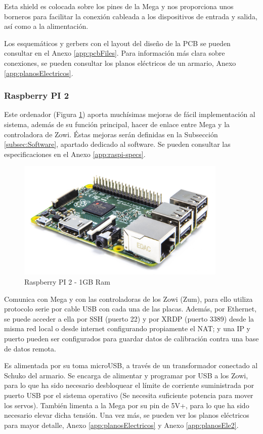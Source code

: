 Esta shield es colocada sobre los pines de la Mega y nos proporciona unos borneros para facilitar la conexión cableada a los dispositivos de entrada y salida, así como a la alimentación.

Los esquemáticos y gerbers con el layout del diseño de la PCB se pueden consultar en el Anexo \ref{app:pcbFiles}. Para información más clara sobre conexiones, se pueden consultar los planos eléctricos de un armario, Anexo \ref{app:planosElectricos}.

\subsubsection{Raspberry PI 2}

Este ordenador (Figura \ref{fig:raspi}) aporta muchísimas mejoras de fácil implementación al sistema, además de su función principal, hacer de enlace entre Mega y la controladora de Zowi. Éstas mejoras serán definidas en la Subsección \ref{subsec:Software}, apartado dedicado al software. Se pueden consultar las especificaciones en el Anexo \ref{app:raspi-specs}.

\begin{figure}
\centering
\includegraphics[width=100mm]{Figures/raspi}
\caption{Raspberry PI 2 - 1GB Ram}
\label{fig:raspi}
\end{figure}

Comunica con Mega y con las controladoras de los Zowi (Zum), para ello utiliza protocolo serie por cable USB con cada una de las placas. Además, por Ethernet, se puede acceder a ella por SSH (puerto 22) y por XRDP (puerto 3389) desde la misma red local o desde internet configurando propiamente el NAT; y una IP y puerto pueden ser configurados para guardar datos de calibración contra una base de datos remota.

Es alimentada por su toma microUSB, a través de un transformador conectado al Schuko del armario. Se encarga de alimentar y programar por USB a los Zowi, para lo que ha sido necesario desbloquear el límite de corriente suministrada por puerto USB por el sistema operativo (Se necesita suficiente potencia para mover los servos). También limenta a la Mega por su pin de 5V+, para lo que ha sido necesario elevar dicha tensión. Una vez más, se pueden ver los planos eléctricos para mayor detalle, Anexo \ref{app:planosElectricos} y Anexo \ref{app:planosEle2}.

